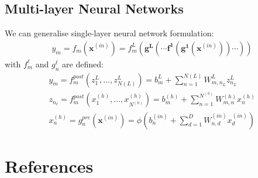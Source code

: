 \documentclass[twoside,11pt]{article}
\begin{document}
\subsection{Multi-layer Neural Networks}
We can generalise single-layer neural network formulation:
\begin{align}
    \label{single-layer}
    y_m = f_m\left(\textbf{x}^{(in)}\right) = f_m^{L}\left(\mathbf{g^{L}}\left(\cdots \mathbf{f^{1}}\left(\mathbf{g^{1}}\left(\textbf{x}^{(in)}\right)\right)\cdots\right)\right) 
\end{align}
with $f_m^{\ell}$ and $g_{n}^{\ell}$ are defined:
\begin{align}
    \label{single-layer-out}
    y_m = f_m^{post}\left(z_{1}^{L}, \dots, z_{N(L)}^{L}\right) = b_m^{L} + \sum_{n = 1}^{N(L)} W_{m, n_{L}}^{L} z_{n_{L}}^{L} \\
    \label{single-layer-post}
    z_{n_{\ell}} = f_m^{post}\left(x_{1}^{(h)}, \dots, x_{N^{(h)}}^{(h)}\right) = b_m^{(h)} + \sum_{n = 1}^{N^{(h)}} W_{m, n}^{(h)} x_{n}^{(h)} \\
    \label{single-layer-pre}
    x_{n}^{(h)} = g_{n}^{pre}\left(\mathbf{x}^{(in)}\right) = \phi \left(b_n^{(in)} + \sum_{d=1}^{D} W_{n, d}^{(in)}x_{d}^{(in)}\right)
\end{align}
\begingroup
\let\clearpage\relax
\AtNextBibliography{\small}
\section*{References}
\printbibliography[heading=talikarng, title = {References}]
\endgroup
\end{document}
